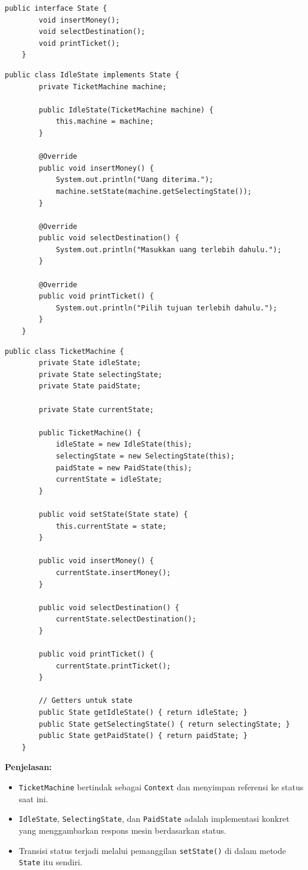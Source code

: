 \begin{lstlisting}[style=JavaStyle, caption={State Interface}]
	public interface State {
		void insertMoney();
		void selectDestination();
		void printTicket();
	}
\end{lstlisting}

\begin{lstlisting}[style=JavaStyle, caption={ConcreteState: IdleState}]
	public class IdleState implements State {
		private TicketMachine machine;
		
		public IdleState(TicketMachine machine) {
			this.machine = machine;
		}
		
		@Override
		public void insertMoney() {
			System.out.println("Uang diterima.");
			machine.setState(machine.getSelectingState());
		}
		
		@Override
		public void selectDestination() {
			System.out.println("Masukkan uang terlebih dahulu.");
		}
		
		@Override
		public void printTicket() {
			System.out.println("Pilih tujuan terlebih dahulu.");
		}
	}
\end{lstlisting}

\begin{lstlisting}[style=JavaStyle, caption={Context: TicketMachine}]
	public class TicketMachine {
		private State idleState;
		private State selectingState;
		private State paidState;
		
		private State currentState;
		
		public TicketMachine() {
			idleState = new IdleState(this);
			selectingState = new SelectingState(this);
			paidState = new PaidState(this);
			currentState = idleState;
		}
		
		public void setState(State state) {
			this.currentState = state;
		}
		
		public void insertMoney() {
			currentState.insertMoney();
		}
		
		public void selectDestination() {
			currentState.selectDestination();
		}
		
		public void printTicket() {
			currentState.printTicket();
		}
		
		// Getters untuk state
		public State getIdleState() { return idleState; }
		public State getSelectingState() { return selectingState; }
		public State getPaidState() { return paidState; }
	}
\end{lstlisting}

\textbf{Penjelasan:}
\begin{itemize}
	\item \texttt{TicketMachine} bertindak sebagai \texttt{Context} dan menyimpan referensi ke status saat ini.
	\item \texttt{IdleState}, \texttt{SelectingState}, dan \texttt{PaidState} adalah implementasi konkret yang menggambarkan respons mesin berdasarkan status.
	\item Transisi status terjadi melalui pemanggilan \texttt{setState()} di dalam metode \texttt{State} itu sendiri.
\end{itemize}

